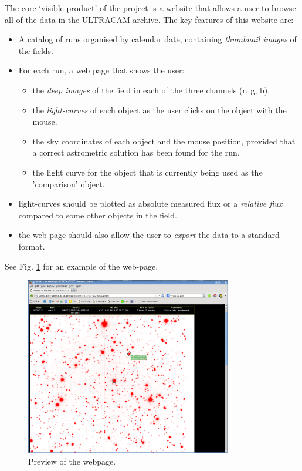 The core `visible product' of the project is a website that allows a user to browse all of the data in the ULTRACAM archive. The key features of this website are:

\begin{itemize}
	\item A catalog of runs organised by calendar date, containing \emph{thumbnail images} of the fields.
	\item For each run, a web page that shows the user:
	\begin{itemize}
		\item the \emph{deep images} of the field in each of the three channels (r, g, b).
		\item the \emph{light-curves} of each object as the user clicks on the object with the mouse. 
		\item the sky coordinates of each object and the mouse position, provided that a correct astrometric solution has been found for the run. 
		\item the light curve for the object that is currently being used as the 'comparison' object. 
	\end{itemize}
	\item light-curves should be plotted as absolute measured flux or a \emph{relative flux} compared to some other objects in the field. 
	\item the web page should also allow the user to \emph{export} the data to a standard format.
	
\end{itemize}
See Fig. \ref{browser} for an example of the web-page. 


\begin{figure}[!h]
	\centering
	\includegraphics[width=90mm]{images/website1.png}
	\caption{Preview of the webpage.}
	\label{browser}
\end{figure}

